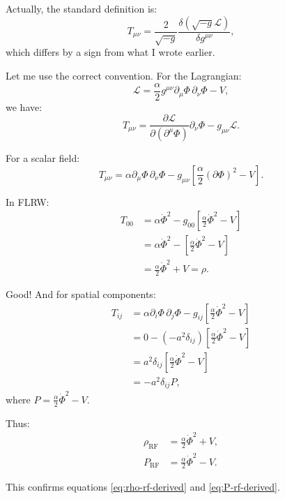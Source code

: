 \documentclass[11pt,a4paper]{article}
\numberwithin{equation}{section}
\theoremstyle{plain}
\theoremstyle{definition}
\theoremstyle{remark}
\begin{document}
Actually, the standard definition is:
\begin{equation}
T_{\mu\nu} = \frac{2}{\sqrt{-g}}\frac{\delta(\sqrt{-g}\mathcal{L})}{\delta g^{\mu\nu}},
\end{equation}
which differs by a sign from what I wrote earlier.

Let me use the correct convention. For the Lagrangian:
\begin{equation}
\mathcal{L} = \frac{\alpha}{2}g^{\mu\nu}\partial_\mu\Phi\,\partial_\nu\Phi - V,
\end{equation}
we have:
\begin{equation}
T_{\mu\nu} = \frac{\partial\mathcal{L}}{\partial(\partial^\mu\Phi)}\partial_\nu\Phi - g_{\mu\nu}\mathcal{L}.
\end{equation}

For a scalar field:
\begin{equation}
T_{\mu\nu} = \alpha\partial_\mu\Phi\,\partial_\nu\Phi - g_{\mu\nu}\left[\frac{\alpha}{2}(\partial\Phi)^2 - V\right].
\end{equation}

In FLRW:
\begin{align}
T_{00} &= \alpha\dot{\Phi}^2 - g_{00}\left[\frac{\alpha}{2}\dot{\Phi}^2 - V\right]\\
&= \alpha\dot{\Phi}^2 - \left[\frac{\alpha}{2}\dot{\Phi}^2 - V\right]\\
&= \frac{\alpha}{2}\dot{\Phi}^2 + V = \rho.
\end{align}

Good! And for spatial components:
\begin{align}
T_{ij} &= \alpha\partial_i\Phi\,\partial_j\Phi - g_{ij}\left[\frac{\alpha}{2}\dot{\Phi}^2 - V\right]\\
&= 0 - (-a^2\delta_{ij})\left[\frac{\alpha}{2}\dot{\Phi}^2 - V\right]\\
&= a^2\delta_{ij}\left[\frac{\alpha}{2}\dot{\Phi}^2 - V\right]\\
&= -a^2\delta_{ij}P,
\end{align}
where $P = \frac{\alpha}{2}\dot{\Phi}^2 - V$.

Thus:
\begin{align}
\rho_{\mathrm{RF}} &= \frac{\alpha}{2}\dot{\Phi}^2 + V,\\
P_{\mathrm{RF}} &= \frac{\alpha}{2}\dot{\Phi}^2 - V.
\end{align}

This confirms equations \eqref{eq:rho-rf-derived} and \eqref{eq:P-rf-derived}.
\end{document}

